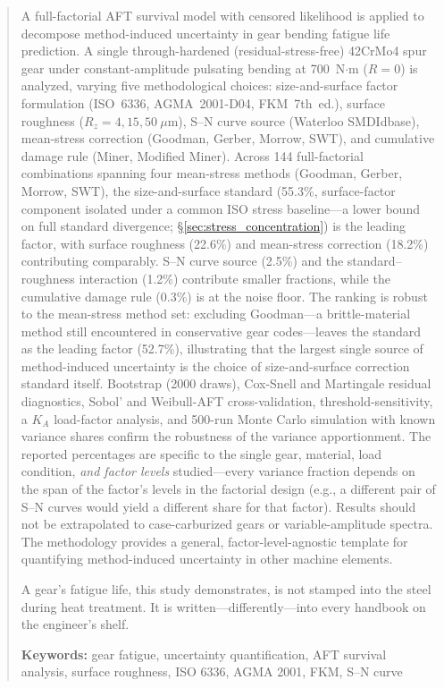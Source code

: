 \documentclass[twocolumn,12pt,a4paper]{article}
\begin{document}
\begin{abstract}
\label{sec:abstract}

A full-factorial AFT survival model with censored likelihood is
applied to decompose method-induced uncertainty in gear bending fatigue
life prediction. A single through-hardened (residual-stress-free)
42CrMo4 spur gear under constant-amplitude pulsating bending at
700~N$\cdot$m ($R=0$) is analyzed, varying five methodological choices:
size-and-surface factor formulation (ISO~6336, AGMA~2001-D04,
FKM~7th~ed.), surface roughness ($R_z=4,15,50~\mu$m), S--N curve
source (Waterloo SMDIdbase), mean-stress correction (Goodman, Gerber,
Morrow, SWT), and cumulative damage rule (Miner, Modified Miner).
Across 144 full-factorial combinations spanning four mean-stress
methods (Goodman, Gerber, Morrow, SWT), the size-and-surface standard
(55.3\%, surface-factor component isolated under a common ISO stress
baseline---a lower bound on full standard divergence;
\S\ref{sec:stress_concentration}) is the leading factor, with
surface roughness (22.6\%) and mean-stress correction (18.2\%)
contributing comparably. S--N curve source (2.5\%) and the
standard--roughness interaction (1.2\%) contribute smaller fractions,
while the cumulative damage rule (0.3\%) is at the noise floor. The
ranking is robust to the mean-stress method
set: excluding Goodman---a brittle-material method still encountered
in conservative gear codes---leaves the standard as the leading
factor (52.7\%), illustrating that the largest single source of
method-induced uncertainty is the choice of size-and-surface
correction standard itself. Bootstrap (2000 draws), Cox-Snell and Martingale
residual diagnostics, Sobol' and Weibull-AFT cross-validation,
threshold-sensitivity, a $K_A$ load-factor analysis, and 500-run
Monte Carlo simulation with known variance shares confirm
the robustness of the variance apportionment.
The reported percentages are specific to the single gear, material, load
condition, \emph{and factor levels} studied---every variance fraction
depends on the span of the factor's levels in the factorial design
(e.g., a different pair of S--N curves would yield a different share
for that factor). Results should not be extrapolated to case-carburized
gears or variable-amplitude spectra. The methodology provides a
general, factor-level-agnostic template for quantifying
method-induced uncertainty in other machine elements.

A gear's fatigue life, this study demonstrates, is not stamped into
the steel during heat treatment. It is written---differently---into
every handbook on the engineer's shelf.

\textbf{Keywords:} gear fatigue, uncertainty quantification, AFT survival analysis,
surface roughness, ISO 6336, AGMA 2001, FKM, S--N curve
\end{abstract}
\end{document}
